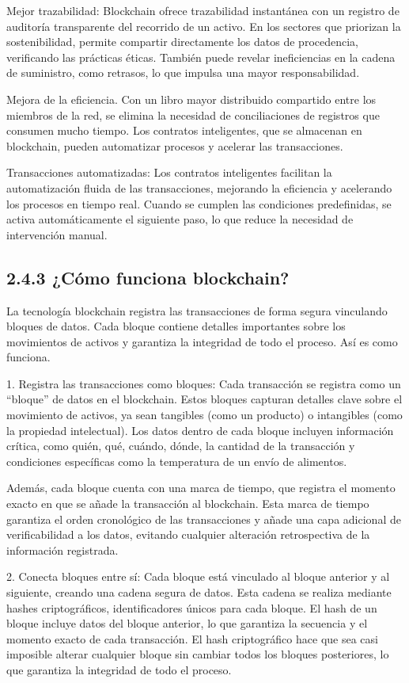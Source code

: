 \documentclass[12pt,a4paper]{article}
\begin{document}
Mejor trazabilidad: Blockchain ofrece trazabilidad instantánea con un registro de auditoría transparente del recorrido de un activo. En los sectores que priorizan la sostenibilidad, permite compartir directamente los datos de procedencia, verificando las prácticas éticas. También puede revelar ineficiencias en la cadena de suministro, como retrasos, lo que impulsa una mayor responsabilidad.

Mejora de la eficiencia. Con un libro mayor distribuido compartido entre los miembros de la red, se elimina la necesidad de conciliaciones de registros que consumen mucho tiempo. Los contratos inteligentes, que se almacenan en blockchain, pueden automatizar procesos y acelerar las transacciones.

Transacciones automatizadas: Los contratos inteligentes facilitan la automatización fluida de las transacciones, mejorando la eficiencia y acelerando los procesos en tiempo real. Cuando se cumplen las condiciones predefinidas, se activa automáticamente el siguiente paso, lo que reduce la necesidad de intervención manual.

\subsection*{2.4.3 ¿Cómo funciona blockchain?}

La tecnología blockchain registra las transacciones de forma segura vinculando bloques de datos. Cada bloque contiene detalles importantes sobre los movimientos de activos y garantiza la integridad de todo el proceso. Así es como funciona.

1. Registra las transacciones como bloques: Cada transacción se registra como un ``bloque'' de datos en el blockchain. Estos bloques capturan detalles clave sobre el movimiento de activos, ya sean tangibles (como un producto) o intangibles (como la propiedad intelectual). Los datos dentro de cada bloque incluyen información crítica, como quién, qué, cuándo, dónde, la cantidad de la transacción y condiciones específicas como la temperatura de un envío de alimentos.

Además, cada bloque cuenta con una marca de tiempo, que registra el momento exacto en que se añade la transacción al blockchain. Esta marca de tiempo garantiza el orden cronológico de las transacciones y añade una capa adicional de verificabilidad a los datos, evitando cualquier alteración retrospectiva de la información registrada.

2. Conecta bloques entre sí: Cada bloque está vinculado al bloque anterior y al siguiente, creando una cadena segura de datos. Esta cadena se realiza mediante hashes criptográficos, identificadores únicos para cada bloque. El hash de un bloque incluye datos del bloque anterior, lo que garantiza la secuencia y el momento exacto de cada transacción. El hash criptográfico hace que sea casi imposible alterar cualquier bloque sin cambiar todos los bloques posteriores, lo que garantiza la integridad de todo el proceso.
\end{document}
